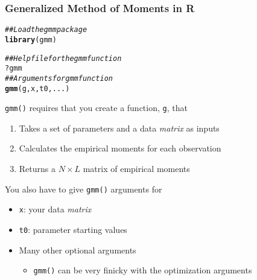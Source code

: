 \documentclass{beamer}\usepackage[]{graphicx}\usepackage[]{xcolor}
\makeatletter
\newcommand{\hlcom}[1]{\textcolor[rgb]{0.678,0.584,0.686}{\textit{#1}}}%
\newcommand{\hlopt}[1]{\textcolor[rgb]{0,0,0}{#1}}%
\newcommand{\hlstd}[1]{\textcolor[rgb]{0.345,0.345,0.345}{#1}}%
\newcommand{\hlkwd}[1]{\textcolor[rgb]{0.737,0.353,0.396}{\textbf{#1}}}%
\newenvironment{kframe}{%
 \def\at@end@of@kframe{}%
 \ifinner\ifhmode%
  \def\at@end@of@kframe{\end{minipage}}%
  \begin{minipage}{\columnwidth}%
 \fi\fi%
 \def\FrameCommand##1{\hskip\@totalleftmargin \hskip-\fboxsep
 \colorbox{shadecolor}{##1}\hskip-\fboxsep
     \hskip-\linewidth \hskip-\@totalleftmargin \hskip\columnwidth}%
 \MakeFramed {\advance\hsize-\width
   \@totalleftmargin\z@ \linewidth\hsize
   \@setminipage}}%
 {\par\unskip\endMakeFramed%
 \at@end@of@kframe}
\newenvironment{knitrout}{}{} %
\makeatother
\begin{document}
\begin{frame}[fragile]\frametitle{Generalized Method of Moments in R}
\begin{knitrout}\footnotesize
{}\color{fgcolor}\begin{kframe}
\begin{alltt}
\hlcom{## Load the gmm package}
\hlkwd{library}\hlstd{(gmm)}
\end{alltt}
\end{kframe}
\end{knitrout}
\begin{knitrout}\footnotesize
{}\color{fgcolor}\begin{kframe}
\begin{alltt}
\hlcom{## Help file for the gmm function}
\hlopt{?}\hlstd{gmm}
\hlcom{## Arguments for gmm function}
\hlkwd{gmm}\hlstd{(g, x, t0, ...)}
\end{alltt}
\end{kframe}
\end{knitrout}
    \texttt{gmm()} requires that you create a function, \texttt{g}, that
    \begin{enumerate}
        \item Takes a set of parameters and a data \emph{matrix} as inputs
        \item Calculates the empirical moments for each observation
        \item Returns a $N \times L$ matrix of empirical moments
    \end{enumerate}
    You also have to give \texttt{gmm()} arguments for
    \begin{itemize}
        \item \texttt{x}: your data \emph{matrix}
        \item \texttt{t0}: parameter starting values
        \item Many other optional arguments
        \begin{itemize}
            \item \texttt{gmm()} can be very finicky with the optimization arguments
        \end{itemize}
    \end{itemize}
\end{frame}
\end{document}
